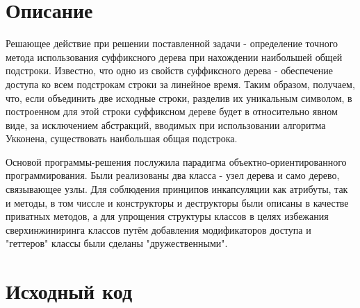 \section{Описание}

Решающее действие при решении поставленной задачи - определение точного метода использования суффиксного дерева при нахождении наибольшей общей подстроки. Известно, что одно из свойств суффиксного дерева - обеспечение доступа ко всем подстрокам строки за линейное время. Таким образом, получаем, что, если объединить две исходные строки, разделив их уникальным символом, в построенном для этой строки суффиксном дереве будет в относительно явном виде, за исключением абстракций, вводимых при использовании алгоритма Укконена, существовать наибольшая общая подстрока.

\par

Основой программы-решения послужила парадигма объектно-ориентированного программирования. Были реализованы два класса - узел дерева и само дерево, связывающее узлы. Для соблюдения принципов инкапсуляции как атрибуты, так и методы, в том чиссле и конструкторы и деструкторы были описаны в качестве приватных методов, а для упрощения структуры классов в целях избежания сверхинжиниринга классов путём добавления модификаторов доступа и "геттеров" классы были сделаны "дружественными".

\pagebreak

\section{Исходный код}

\vspace{\baselineskip}

